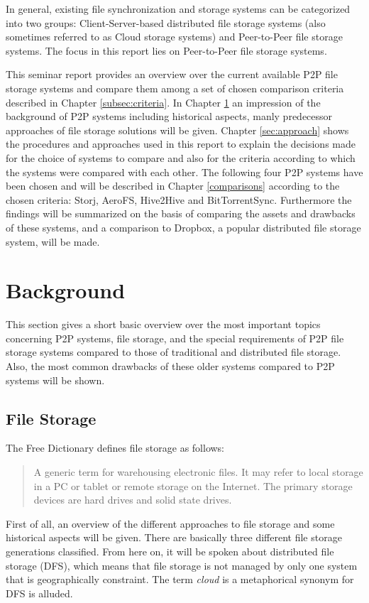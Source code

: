 In general, existing file synchronization and storage systems can be categorized into two groups: Client-Server-based distributed file storage systems (also sometimes referred to as Cloud storage systems) and Peer-to-Peer file storage systems. The focus in this report lies on Peer-to-Peer file storage systems.

This seminar report provides an overview over the current available P2P file storage systems and compare them among a set of chosen comparison criteria described in Chapter \ref{subsec:criteria}. In Chapter \ref{sec:background} an impression of the background of P2P systems including historical aspects, manly predecessor approaches of file storage solutions will be given. Chapter \ref{sec:approach} shows the procedures and approaches used in this report to explain the decisions made for the choice of systems to compare and also for the criteria according to which the systems were compared with each other. The following four P2P systems have been chosen and will be described in Chapter \ref{comparisons} according to the chosen criteria: Storj, AeroFS, Hive2Hive and BitTorrentSync. Furthermore the findings will be summarized on the basis of comparing the assets and drawbacks of these systems, and a comparison to Dropbox, a popular distributed file storage system, will be made.

\section{Background}
\label{sec:background}
This section gives a short basic overview over the most important topics concerning P2P systems, file storage, and the special requirements of P2P file storage systems compared to those of traditional and distributed file storage. Also, the most common drawbacks of these older systems compared to P2P systems will be shown.

\subsection{File Storage}
The Free Dictionary defines file storage as follows:
\begin{quote}
A generic term for warehousing electronic files. It may refer to local storage in a PC or tablet or remote storage on the Internet. The primary storage devices are hard drives and solid state drives. \cite{thefreedictionary}
\end{quote}
First of all, an overview of the different approaches to file storage and some historical aspects will be given. There are basically three different file storage generations classified. From here on, it will be spoken about distributed file storage (DFS), which means that file storage is not managed by only one system that is geographically constraint. The term \textit{cloud} is a metaphorical synonym for DFS is alluded.

